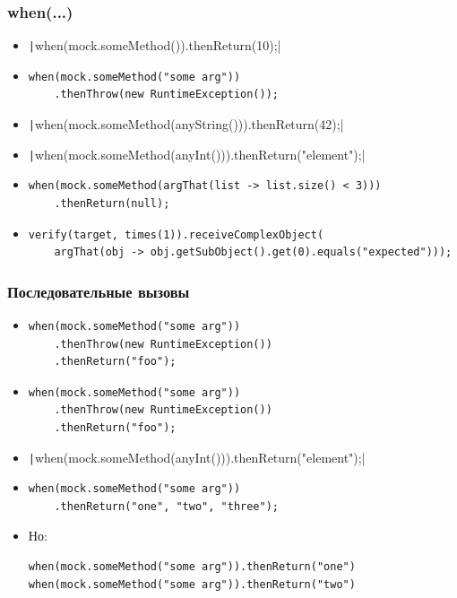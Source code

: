 \documentclass[xetex,mathserif,serif]{beamer}
\begin{document}
	\begin{frame}[fragile]
		\frametitle{when(...)}
		\begin{itemize}
			\item \texttt|when(mock.someMethod()).thenReturn(10);|
			\pause
			\item 
				\begin{verbatim}
when(mock.someMethod("some arg"))
    .thenThrow(new RuntimeException());
				\end{verbatim}
			\pause
			\item \texttt|when(mock.someMethod(anyString())).thenReturn(42);|
			\pause
			\item \texttt|when(mock.someMethod(anyInt())).thenReturn("element");|
			\pause
			\item 
				\begin{verbatim}
when(mock.someMethod(argThat(list -> list.size() < 3)))
    .thenReturn(null);
				\end{verbatim}
			\pause
			\item 
				\begin{verbatim}
verify(target, times(1)).receiveComplexObject(
    argThat(obj -> obj.getSubObject().get(0).equals("expected")));
				\end{verbatim}
		\end{itemize}
	\end{frame}

	\begin{frame}[fragile]
		\frametitle{Последовательные вызовы}
		\begin{itemize}
			\item 
				\begin{verbatim}
when(mock.someMethod("some arg"))
    .thenThrow(new RuntimeException())
    .thenReturn("foo");
				\end{verbatim}
			\pause
			\item 
				\begin{verbatim}
when(mock.someMethod("some arg"))
    .thenThrow(new RuntimeException())
    .thenReturn("foo");
				\end{verbatim}
			\pause
			\item \texttt|when(mock.someMethod(anyInt())).thenReturn("element");|
			\pause
			\item 
				\begin{verbatim}
when(mock.someMethod("some arg"))
    .thenReturn("one", "two", "three");
				\end{verbatim}
			\pause
			\item Но:
				\begin{verbatim}
when(mock.someMethod("some arg")).thenReturn("one")
when(mock.someMethod("some arg")).thenReturn("two")
				\end{verbatim}
		\end{itemize}
	\end{frame}
\end{document}
